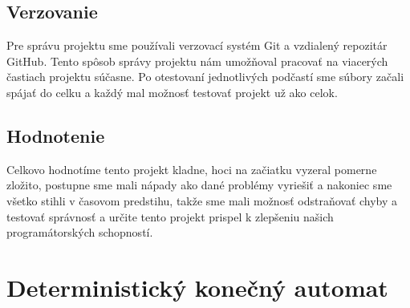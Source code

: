 \documentclass [11pt, a4paper]{article}
\begin{document}
\subsection{Verzovanie}
Pre správu projektu sme používali verzovací systém Git a vzdialený repozitár GitHub. Tento spôsob správy projektu nám umožňoval pracovať na viacerých častiach projektu súčasne. Po otestovaní jednotlivých podčastí sme súbory začali spájať do celku a každý mal možnosť testovať projekt už ako celok.

\subsection{Hodnotenie}
Celkovo hodnotíme tento projekt kladne, hoci na začiatku vyzeral pomerne zložito, postupne sme mali nápady ako dané problémy vyriešiť a nakoniec sme všetko stihli v časovom predstihu, takže sme mali možnosť odstraňovať chyby a testovať správnosť a určite tento projekt prispel k zlepšeniu našich programátorských schopností.
\newpage

\renewcommand{\refname}{Použitá literatúra}


\newpage
\appendix

\section{Deterministický konečný automat}
\clearpage
\end{document}
